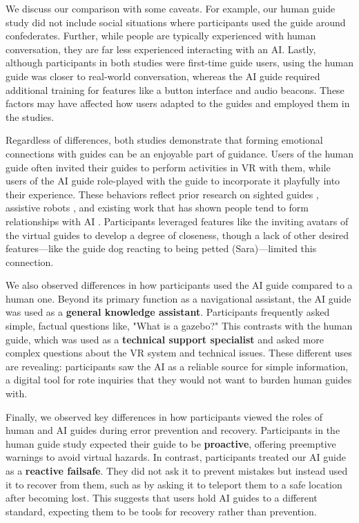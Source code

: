 We discuss our comparison with some caveats. For example, our human guide study did not include social situations where participants used the guide around confederates. Further, while people are typically experienced with human conversation, they are far less experienced interacting with an AI. Lastly, although participants in both studies were first-time guide users, using the human guide was closer to real-world conversation, whereas the AI guide required additional training for features like a button interface and audio beacons. These factors may have affected how users adapted to the guides and employed them in the studies.

Regardless of differences, both studies demonstrate that forming emotional connections with guides can be an enjoyable part of guidance. Users of the human guide often invited their guides to perform activities in VR with them, while users of the AI guide role-played with the guide to incorporate it playfully into their experience. These behaviors reflect prior research on sighted guides \cite{guerreiro2019cabot, ball2022runners}, assistive robots \cite{bonani2018robots}, and existing work that has shown people tend to form relationships with AI \cite{zimmerman2023humanai, gur2025algorithm}. Participants leveraged features like the inviting avatars of the virtual guides to develop a degree of closeness, though a lack of other desired features—like the guide dog reacting to being petted (Sara)—limited this connection.

We also observed differences in how participants used the AI guide compared to a human one. Beyond its primary function as a navigational assistant, the AI guide was used as a \textbf{general knowledge assistant}. Participants frequently asked simple, factual questions like, "What is a gazebo?" This contrasts with the human guide, which was used as a \textbf{technical support specialist} and asked more complex questions about the VR system and technical issues. These different uses are revealing: participants saw the AI as a reliable source for simple information, a digital tool for rote inquiries that they would not want to burden human guides with.

Finally, we observed key differences in how participants viewed the roles of human and AI guides during error prevention and recovery. Participants in the human guide study expected their guide to be \textbf{proactive}, offering preemptive warnings to avoid virtual hazards. In contrast, participants treated our AI guide as a \textbf{reactive failsafe}. They did not ask it to prevent mistakes but instead used it to recover from them, such as by asking it to teleport them to a safe location after becoming lost. This suggests that users hold AI guides to a different standard, expecting them to be tools for recovery rather than prevention.

